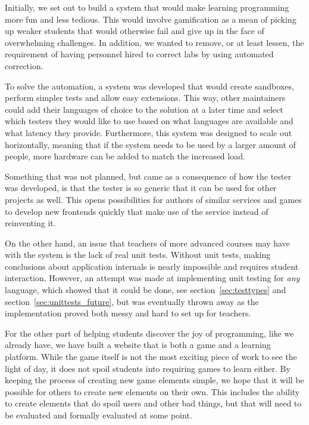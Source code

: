 Initially, we set out to build a system that would make learning programming more fun and less tedious. This would involve gamification as a mean of picking up weaker students that would otherwise fail and give up in the face of overwhelming challenges. In addition, we wanted to remove, or at least lessen, the requirement of having personnel hired to correct labs by using automated correction.

To solve the automation, a system was developed that would create sandboxes, perform simpler tests and allow easy extensions. This way, other maintainers could add their languages of choice to the solution at a later time and select which testers they would like to use based on what languages are available and what latency they provide. Furthermore, this system was designed to scale out horizontally, meaning that if the system needs to be used by a larger amount of people, more hardware can be added to match the increased load.

Something that was not planned, but came as a consequence of how the tester was developed, is that the tester is so generic that it can be used for other projects as well. This opens possibilities for authors of similar services and games to develop new frontends quickly that make use of the service instead of reinventing it.

On the other hand, an issue that teachers of more advanced courses may have with the system is the lack of real unit tests. Without unit tests, making conclusions about application internals is nearly impossible and requires student interaction. However, an attempt was made at implementing unit testing for \emph{any} language, which showed that it could be done, see section~\ref{sec:testtypes} and section~\ref{sec:unittests_future}, but was eventually thrown away as the implementation proved both messy and hard to set up for teachers.

For the other part of helping students discover the joy of programming, like we already have, we have built a website that is both a game and a learning platform. While the game itself is not the most exciting piece of work to see the light of day, it does not spoil students into requiring games to learn either. By keeping the process of creating new game elements simple, we hope that it will be possible for others to create new elements on their own. This includes the ability to create elements that do spoil users and other bad things, but that will need to be evaluated and formally evaluated at some point.

